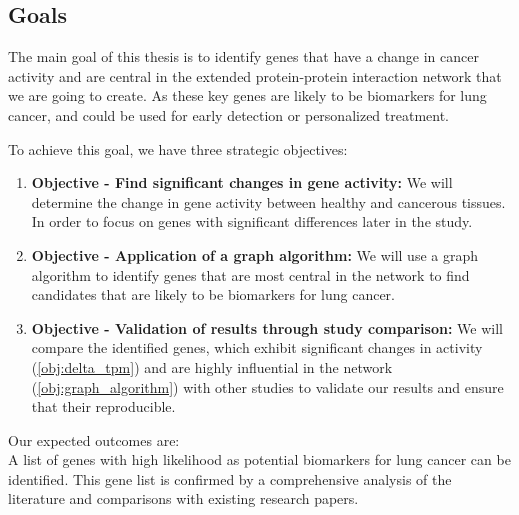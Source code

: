 \subsection{Goals} \label{subsec:goals}

The main goal of this thesis is to identify genes that have a change in cancer activity
and are central in the extended protein-protein interaction network that we are going to create.
As these key genes are likely to be biomarkers for lung cancer,
and could be used for early detection or personalized treatment.

To achieve this goal, we have three strategic objectives:
\begin{enumerate}
    \item \textbf{Objective - Find significant changes in gene activity:}
    We will determine the change in gene activity between healthy and cancerous tissues.
    In order to focus on genes with significant differences later in the study.
    \label{obj:delta_tpm}

    \item \textbf{Objective - Application of a graph algorithm:}
    We will use a graph algorithm to identify genes that are most central in the network
    to find candidates that are likely to be biomarkers for lung cancer.
    \label{obj:graph_algorithm}

    \item \textbf{Objective - Validation of results through study comparison:}
    We will compare the identified genes,
    which exhibit significant changes in activity (\ref{obj:delta_tpm})
    and are highly influential in the network (\ref{obj:graph_algorithm}) with other studies
    to validate our results and ensure that their reproducible.
    \label{obj:validation}
\end{enumerate}

{\color{lightgray}
Our expected outcomes are:\\
A list of genes with high likelihood as potential biomarkers for lung cancer can be identified.
This gene list is confirmed by a comprehensive analysis of the literature and comparisons with existing research papers.
}